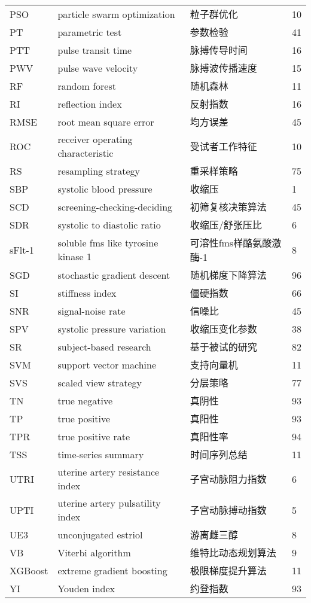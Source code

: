 \begin{center}
\begin{longtable}{m{2cm}m{7cm}m{5cm}m{1cm}<{\centering}}
        PSO & particle swarm optimization & 粒子群优化 & 10 \\
        PT  & parametric test & 参数检验 & 41 \\
        PTT & pulse transit time & 脉搏传导时间  & 16\\
        PWV & pulse wave velocity & 脉搏波传播速度&15 \\
        RF&random forest&随机森林 & 11\\
        RI &reflection index & 反射指数 & 16 \\
        RMSE & root mean square error & 均方误差 & 45 \\
        ROC & receiver operating characteristic & 受试者工作特征  & 10 \\
        RS & resampling strategy & 重采样策略 & 75 \\
        SBP     &       systolic blood pressure                         &   收缩压                 &    1   \\
        SCD & screening-checking-deciding & 初筛复核决策算法  & 45\\
        SDR     &  systolic to diastolic ratio & 收缩压/舒张压比 & 6\\
        sFlt-1  & soluble fms like tyrosine kinase 1    & 可溶性fms样酪氨酸激酶-1 & 8\\
        SGD & stochastic gradient descent & 随机梯度下降算法 & 96 \\
        SI & stiffness index & 僵硬指数 &66\\
        SNR & signal-noise rate & 信噪比 & 45 \\
        SPV & systolic pressure variation & 收缩压变化参数 & 38 \\
        SR & subject-based research &基于被试的研究 & 82 \\
        SVM&support vector machine&支持向量机 & 11\\
        SVS & scaled view strategy & 分层策略 & 77 \\
        TN & true negative & 真阴性 & 93 \\
        TP &  true positive & 真阳性 & 93 \\
        TPR &  true positive rate & 真阳性率 & 94 \\
        TSS & time-series summary & 时间序列总结 & 11 \\
        UTRI      &   uterine artery resistance index & 子宫动脉阻力指数 & 6\\
        UPTI     &       uterine artery pulsatility index                         &   子宫动脉搏动指数                &    5   \\
        UE3     & unconjugated estriol & 游离雌三醇 & 8\\
        VB   & Viterbi algorithm & 维特比动态规划算法 & 9 \\
        XGBoost & extreme gradient boosting & 极限梯度提升算法 & 11 \\
        YI  & Youden index & 约登指数& 93 \\
	\end{longtable}
\end{center}